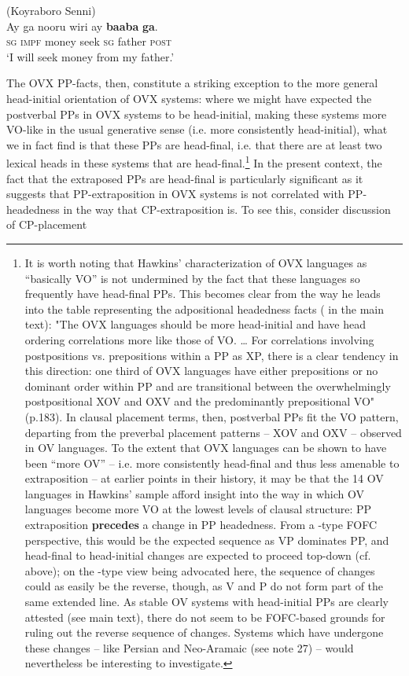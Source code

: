 \documentclass[output=paper]{LSP/langsci}
\begin{document}
         \ex  (Koyraboro Senni)\\
\gll Ay   ga    nooru   wiri    ay   \textbf{baaba} \textbf{ga}. \\
    \textsc{sg}  \textsc{impf} money seek   \textsc{sg} father  \textsc{post}\\

  \glt ‘I will seek money from my father.’    \citep[139]{Heath1999}
\z
\z

The OVX PP-facts, then, constitute a striking exception to the more general head-initial orientation of OVX systems: where we might have expected the postverbal PPs in OVX systems to be head-initial, making these systems more VO-like in the usual generative sense (i.e. more consistently head-initial), what we in fact find is that these PPs are head-final, i.e. that there are at least two lexical heads in these systems that are head-final.\footnote{It is worth noting that Hawkins’ characterization of OVX languages as “basically VO” is not undermined by the fact that these languages so frequently have head-final PPs. This becomes clear from the way he leads into the table representing the adpositional headedness facts ( in the main text):  "The OVX languages should be more head-initial and have head ordering correlations more like those of VO. … For correlations involving postpositions vs. prepositions within a PP as XP, there is a clear tendency in this direction: one third of OVX languages have either prepositions or no dominant order within PP and are transitional between the overwhelmingly postpositional XOV and OXV and the predominantly prepositional VO" (p.183). In clausal placement terms, then, postverbal PPs fit the VO pattern, departing from the preverbal placement patterns – XOV and OXV – observed in OV languages. To the extent that OVX languages can be shown to have been “more OV” – i.e. more consistently head-final and thus less amenable to extraposition – at earlier points in their history, it may be that the 14 OV languages in Hawkins’ sample afford insight into the way in which OV languages become more VO at the lowest levels of clausal structure: PP extraposition \textbf{precedes} a change in PP headedness. From a -type FOFC perspective, this would be the expected sequence as VP dominates PP, and head-final to head-initial changes are expected to proceed top-down (cf.  above); on the -type view being advocated here, the sequence of changes could as easily be the reverse, though, as V and P do not form part of the same extended  line. As stable OV systems with head-initial PPs are clearly attested (see main text), there do not seem to be FOFC-based grounds for ruling out the reverse sequence of changes. Systems which have undergone these changes – like Persian and Neo-Aramaic (see note 27) – would nevertheless be interesting to investigate.} In the present context, the fact that the extraposed PPs are head-final is particularly significant as it suggests that PP-extraposition in OVX systems is not correlated with PP-headedness in the way that CP-extraposition is. To see this, consider  discussion of CP-placement 
\end{document}
